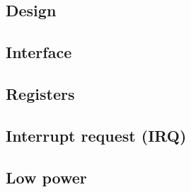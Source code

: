 \documentclass[12pt]{article}
\begin{document}
\subsection{Design}
\subsection{Interface}
\subsection{Registers}
\subsection{Interrupt request (IRQ)}
\subsection{Low power}
\end{document}
